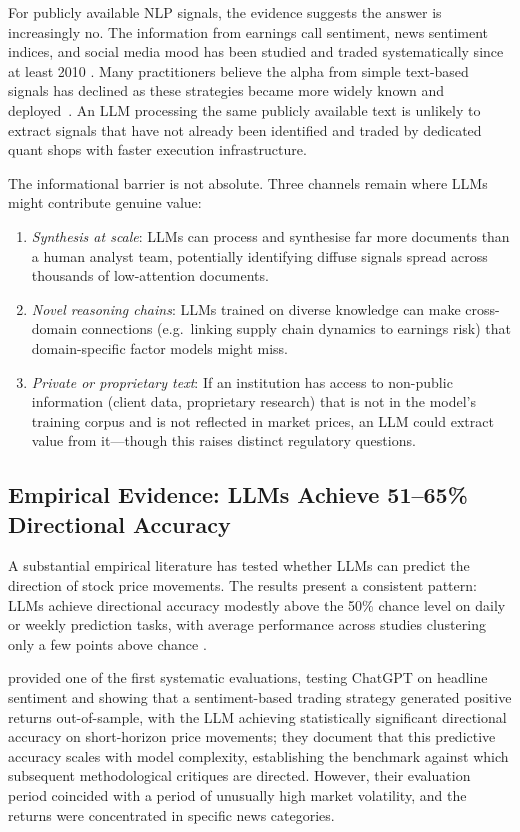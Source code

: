 For publicly available NLP signals, the evidence suggests the answer is increasingly
no. The information from earnings call sentiment, news sentiment indices, and social
media mood has been studied and traded systematically since at least 2010
\cite{tetlock2007giving, bollen2011twitter}. Many practitioners believe the alpha from simple text-based signals has declined as these strategies became more widely known and deployed~\citep{harvey2016cross}.
An LLM processing the same publicly available text is unlikely to extract signals that
have not already been identified and traded by dedicated quant shops with faster
execution infrastructure.

The informational barrier is not absolute. Three channels remain where LLMs might
contribute genuine value:
\begin{enumerate}
  \item \emph{Synthesis at scale}: LLMs can process and synthesise far more documents
        than a human analyst team, potentially identifying diffuse signals spread across
        thousands of low-attention documents.
  \item \emph{Novel reasoning chains}: LLMs trained on diverse knowledge can make
        cross-domain connections (e.g.\ linking supply chain dynamics to earnings risk)
        that domain-specific factor models might miss.
  \item \emph{Private or proprietary text}: If an institution has access to non-public
        information (client data, proprietary research) that is not in the model's
        training corpus and is not reflected in market prices, an LLM could extract
        value from it---though this raises distinct regulatory questions.
\end{enumerate}

\subsection{Empirical Evidence: LLMs Achieve 51--65\% Directional Accuracy}
\label{sec:ch13-empirical-evidence-llm-accuracy}

A substantial empirical literature has tested whether LLMs can predict the direction
of stock price movements. The results present a consistent pattern: LLMs achieve
directional accuracy modestly above the 50\% chance level on daily or weekly prediction
tasks, with average performance across studies clustering only a few points above chance
\cite{xu2024stock}.

\citet{LopezLiraTang2023} provided one of the first systematic evaluations, testing
ChatGPT on headline sentiment and showing that a sentiment-based trading strategy
generated positive returns out-of-sample, with the LLM achieving statistically
significant directional accuracy on short-horizon price movements; they document that this predictive accuracy scales with model
complexity, establishing the benchmark against which subsequent methodological critiques
are directed. However, their evaluation period coincided with a period of unusually high
market volatility, and the returns were concentrated in specific news categories.

